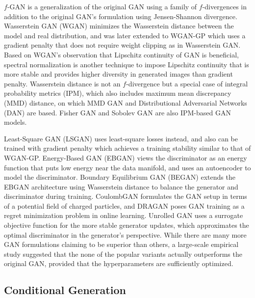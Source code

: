 $f$-GAN \cite{nowozin2016fgan} is a generalization of the original GAN using a family of $f$-divergences in addition to the original GAN's formulation using Jensen-Shannon divergence.
Wasserstein GAN (WGAN) \cite{arjovsky2017wgan} minimizes the Wasserstein distance between the model and real distribution, and was later extended to WGAN-GP \cite{gulrajani2017wgan} which uses a gradient penalty that does not require weight clipping as in Wasserstein GAN.
Based on WGAN's observation that Lipschitz continuity of GAN is beneficial, spectral normalization \cite{miyato2018spectral} is another technique to impose Lipschitz continuity that is more stable and provides higher diversity in generated images than gradient penalty.
Wasserstein distance is not an $f$-divergence but a special case of integral probability metrics (IPM), which also includes maximum mean discrepancy (MMD) distance, on which MMD GAN \cite{li2017mmdgan} and Distributional Adversarial Networks (DAN) \cite{li2017dan} are based.
Fisher GAN \cite{mroueh2017fishergan} and Sobolev GAN \cite{mroueh2018gan} are also IPM-based GAN models.

Least-Square GAN (LSGAN) \cite{mao2017lsgan} uses least-square losses instead, and also can be trained with gradient penalty \cite{mao2018effectiveness} which achieves a training stability similar to that of WGAN-GP.
Energy-Based GAN (EBGAN) \cite{zhao2017ebgan} views the discriminator as an energy function that puts low energy near the data manifold, and uses an autoencoder to model the discriminator. Boundary Equilibrium GAN (BEGAN) \cite{berthelot2017began} extends the EBGAN architecture using Wasserstein distance to balance the generator and discriminator during training.
CoulombGAN \cite{unterthiner2017coulomb} formulates the GAN setup in terms of a potential field of charged particles, and DRAGAN \cite{kodali2017gan} poses GAN training as a regret minimization problem in online learning.
Unrolled GAN \cite{metz2016unrolled} uses a surrogate objective function for the more stable generator updates, which approximates the optimal discriminator in the generator's perspective.
While there are many more GAN formulations claiming to be superior than others, a large-scale empirical study \cite{lucic2017gan} suggested that the none of the popular variants actually outperforms the original GAN, provided that the hyperparameters are sufficiently optimized.


\subsection{Conditional Generation}


